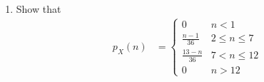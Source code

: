 \documentclass[journal,12pt,onecolumn]{IEEEtran}
\renewcommand\thesection{\arabic{section}}
\providecommand{\brak}[1]{\ensuremath{\left(#1\right)}}
\theoremstyle{remark}
\providecommand{\abs}[1]{\left\vert#1\right\vert}
\numberwithin{equation}{section}
\begin{document}
\begin{enumerate}[label=\arabic*.,ref=\thesection.\theenumi]
%
\item Show that 
\begin{align}
p_X(n) &= 
\begin{cases}
0 & n < 1
\\
\frac{n-1}{36} &  2 \le n \le  7
\\
\frac{13-n}{36} & 7 < n \le 12
\\
0 & n > 12
\end{cases}
\label{eq:dice_x_conv_final}
\end{align}

\end{enumerate}
\end{document}
